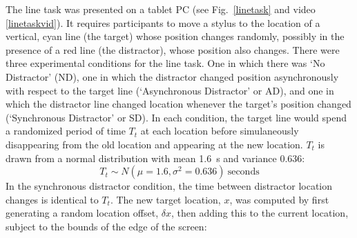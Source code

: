 \documentclass[10pt,letterpaper]{article}
\begin{document}
The line task was presented on a tablet PC (see Fig.~\ref{linetask}
and video \ref{linetaskvid}). It requires participants to move a
stylus to the location of a vertical, cyan line (the target) whose
position changes randomly, possibly in the presence of a red line (the
distractor), whose position also changes. There were three
experimental conditions for the line task. One in which there was `No
Distractor' (ND), one in which the distractor changed position
asynchronously with respect to the target line (`Asynchronous
Distractor' or AD), and one in which the distractor line changed
location whenever the target's position changed (`Synchronous
Distractor' or SD). In each condition, the target line would spend a
randomized period of time $T_t$ at each location before simulaneously
disappearing from the old location and appearing at the new
location. $T_t$ is drawn from a normal distribution with mean 1.6~s
and variance 0.636:
%
%
\begin{equation}\label{eq:tau_target}
  T_t \sim N(\mu=1.6,\sigma^2=0.636)~\text{seconds}
\end{equation}
%
%
%
%
%
%
%
In the synchronous distractor condition, the time between distractor
location changes is identical to $T_t$. The new target location, $x$,
was computed by first generating a random location offset,
${\delta}x$, then adding this to the current location, subject to the
bounds of the edge of the screen:
\end{document}
